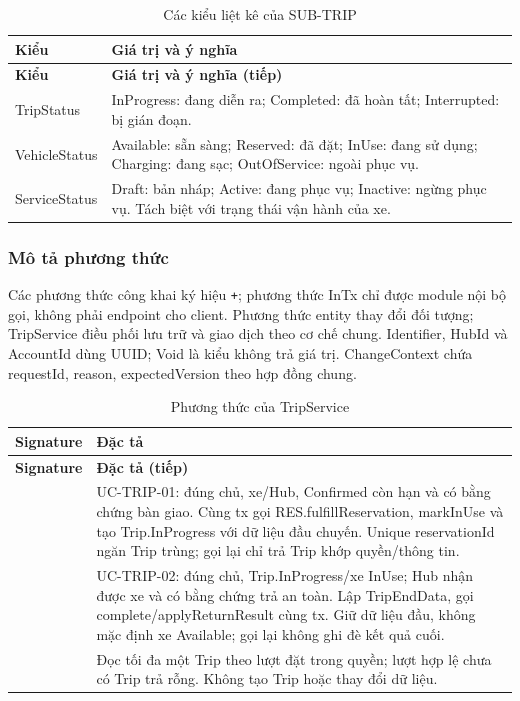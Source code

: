 \begin{longtable}{|L{37mm}|L{102mm}|}
\caption{Các kiểu liệt kê của SUB-TRIP}\\\hline
\textbf{Kiểu} & \textbf{Giá trị và ý nghĩa}\\\hline
\endfirsthead
\hline\textbf{Kiểu} & \textbf{Giá trị và ý nghĩa (tiếp)}\\\hline\endhead
TripStatus & InProgress: đang diễn ra; Completed: đã hoàn tất; Interrupted: bị gián đoạn.\\\hline
VehicleStatus & Available: sẵn sàng; Reserved: đã đặt; InUse: đang sử dụng; Charging: đang sạc; OutOfService: ngoài phục vụ.\\\hline
ServiceStatus & Draft: bản nháp; Active: đang phục vụ; Inactive: ngừng phục vụ. Tách biệt với trạng thái vận hành của xe.\\\hline
\end{longtable}

\subsubsection{Mô tả phương thức}
Các phương thức công khai ký hiệu \texttt{+}; phương thức InTx chỉ được module nội bộ gọi, không phải endpoint cho client. Phương thức entity thay đổi đối tượng; TripService điều phối lưu trữ và giao dịch theo cơ chế chung. Identifier, HubId và AccountId dùng UUID; Void là kiểu không trả giá trị. ChangeContext chứa requestId, reason, expectedVersion theo hợp đồng chung.

\begin{longtable}{|L{58mm}|L{81mm}|}
\caption{Phương thức của TripService}\\\hline
\textbf{Signature} & \textbf{Đặc tả}\\\hline
\endfirsthead
\hline\textbf{Signature} & \textbf{Đặc tả (tiếp)}\\\hline\endhead
{} &
UC-TRIP-01: đúng chủ, xe/Hub, Confirmed còn hạn và có bằng chứng bàn giao. Cùng tx gọi RES.fulfillReservation, markInUse và tạo Trip.InProgress với dữ liệu đầu chuyến. Unique reservationId ngăn Trip trùng; gọi lại chỉ trả Trip khớp quyền/thông tin.\\\hline
{} &
UC-TRIP-02: đúng chủ, Trip.InProgress/xe InUse; Hub nhận được xe và có bằng chứng trả an toàn. Lập TripEndData, gọi complete/applyReturnResult cùng tx. Giữ dữ liệu đầu, không mặc định xe Available; gọi lại không ghi đè kết quả cuối.\\\hline
{} &
Đọc tối đa một Trip theo lượt đặt trong quyền; lượt hợp lệ chưa có Trip trả rỗng. Không tạo Trip hoặc thay đổi dữ liệu.\\\hline
\end{longtable}

